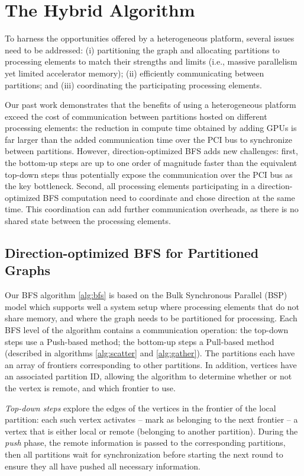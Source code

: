 \documentclass{llncs}
\begin{document}
\section{The Hybrid Algorithm}\label{sec:algorithms}To harness the opportunities offered by a heterogeneous platform, several issues need to be addressed: (i) partitioning the graph and allocating partitions to processing elements to match their strengths and limits (i.e., massive parallelism yet limited accelerator memory); (ii) efficiently communicating between partitions; and (iii) coordinating the participating processing elements. 

Our past work \cite{gharaibeh2014efficient} demonstrates that the benefits of using a heterogeneous platform exceed the cost of communication between partitions hosted on different processing elements: the reduction in compute time obtained by adding GPUs is far larger than the added communication time over the PCI bus to synchronize between partitions. However, direction-optimized BFS adds new challenges: first, the bottom-up steps are up to one order of magnitude faster than the equivalent top-down steps thus potentially expose the communication over the PCI bus as the key bottleneck. Second, all processing elements participating in a direction-optimized BFS computation need to coordinate and chose direction at the same time. This coordination can add further communication overheads, as there is no shared state between the processing elements. 
\subsection{Direction-optimized BFS for Partitioned Graphs}\label{sec:dobfs}Our BFS algorithm \ref{alg:bfs} is based on the Bulk Synchronous Parallel (BSP) model which supports well a system setup where processing elements that do not share memory, and where the graph needs to be partitioned for processing. Each BFS level of the algorithm contains a communication operation: the top-down steps use a Push-based method; the bottom-up steps a Pull-based method (described in algorithms \ref{alg:scatter} and \ref{alg:gather}). The partitions each have an array of frontiers corresponding to other partitions. In addition, vertices have an associated partition ID, allowing the algorithm to determine whether or not the vertex is remote, and which frontier to use.

\textit{Top-down steps} explore the edges of the vertices in the frontier of the local partition: each such vertex activates -- mark as belonging to the next frontier -- a vertex that is either local or remote (belonging to another partition). During the \textit{push} phase, the remote information is passed to the corresponding partitions, then all partitions wait for synchronization before starting the next round to ensure they all have pushed all necessary information.
\end{document}
